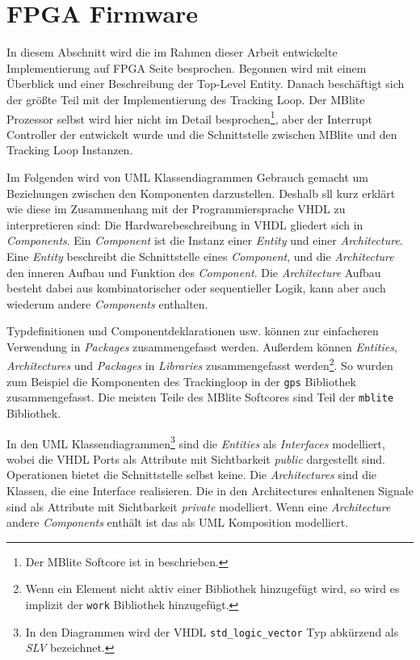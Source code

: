 \section{FPGA Firmware}
In diesem Abschnitt wird die im Rahmen dieser Arbeit entwickelte Implementierung auf FPGA Seite besprochen. Begonnen wird mit einem Überblick und einer Beschreibung der Top-Level Entity. Danach beschäftigt sich der größte Teil mit der Implementierung des Tracking Loop. Der MBlite Prozessor selbst wird hier nicht im Detail besprochen\footnote{Der MBlite Softcore ist in \cite{MBliteThesis} beschrieben.}, aber der Interrupt Controller der entwickelt wurde und die Schnittstelle zwischen MBlite und den Tracking Loop Instanzen.

Im Folgenden wird von UML Klassendiagrammen Gebrauch gemacht um Beziehungen zwischen den Komponenten darzustellen. Deshalb sll kurz erklärt wie diese im Zusammenhang mit der Programmiersprache VHDL zu interpretieren sind: Die Hardwarebeschreibung in VHDL gliedert sich in \emph{Components}. Ein \emph{Component} ist die Instanz einer \emph{Entity} und einer \emph{Architecture}. Eine \emph{Entity} beschreibt die Schnittstelle eines \emph{Component}, und die \emph{Architecture} den inneren Aufbau und Funktion des \emph{Component}. Die \emph{Architecture} Aufbau besteht dabei aus kombinatorischer oder sequentieller Logik, kann aber auch wiederum andere \emph{Components} enthalten.

Typdefinitionen und Componentdeklarationen usw. können zur einfacheren Verwendung in \emph{Packages} zusammengefasst werden. Außerdem können \emph{Entities}, \emph{Architectures} und \emph{Packages} in \emph{Libraries} zusammengefasst werden\footnote{Wenn ein Element nicht aktiv einer Bibliothek hinzugefügt wird, so wird es implizit der \lstinline$work$ Bibliothek hinzugefügt.}. So wurden zum Beispiel die Komponenten des Trackingloop in der \lstinline$gps$ Bibliothek zusammengefasst. Die meisten Teile des MBlite Softcores sind Teil der \lstinline$mblite$ Bibliothek.

In den UML Klassendiagrammen\footnote{In den Diagrammen wird der VHDL \lstinline$std_logic_vector$ Typ abkürzend als \emph{SLV} bezeichnet.} sind die \emph{Entities} als  \emph{Interfaces} modelliert, wobei die VHDL Ports als Attribute mit Sichtbarkeit \emph{public} dargestellt sind. Operationen bietet die Schnittstelle selbst keine. Die \emph{Architectures} sind die Klassen, die eine Interface realisieren. Die in den Architectures enhaltenen Signale sind als Attribute mit Sichtbarkeit \emph{private} modelliert. Wenn eine \emph{Architecture} andere \emph{Components} enthält ist das als UML Komposition modelliert.

